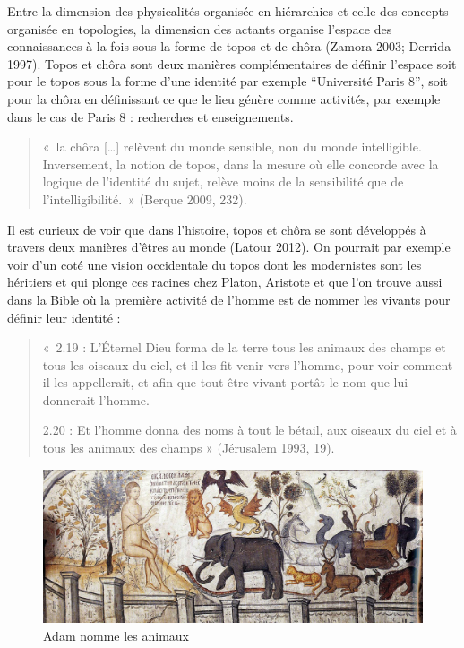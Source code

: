 \documentclass[
  letterpaper,
  DIV=11,
  numbers=noendperiod]{scrreprt}
\begin{document}
Entre la dimension des physicalités organisée en hiérarchies et celle
des concepts organisée en topologies, la dimension des actants organise
l'espace des connaissances à la fois sous la forme de topos et de chôra
(Zamora 2003; Derrida 1997). Topos et chôra sont deux manières
complémentaires de définir l'espace soit pour le topos sous la forme
d'une identité par exemple ``Université Paris 8'', soit pour la chôra en
définissant ce que le lieu génère comme activités, par exemple dans le
cas de Paris 8 : recherches et enseignements.

\begin{quote}
«~la chôra {[}\ldots{]} relèvent du monde sensible, non du monde
intelligible. Inversement, la notion de topos, dans la mesure où elle
concorde avec la logique de l'identité du sujet, relève moins de la
sensibilité que de l'intelligibilité.~» (Berque 2009, 232).
\end{quote}

Il est curieux de voir que dans l'histoire, topos et chôra se sont
développés à travers deux manières d'êtres au monde (Latour 2012). On
pourrait par exemple voir d'un coté une vision occidentale du topos dont
les modernistes sont les héritiers et qui plonge ces racines chez
Platon, Aristote et que l'on trouve aussi dans la Bible où la première
activité de l'homme est de nommer les vivants pour définir leur identité
:

\begin{quote}
«~2.19 : L'Éternel Dieu forma de la terre tous les animaux des champs et
tous les oiseaux du ciel, et il les fit venir vers l'homme, pour voir
comment il les appellerait, et afin que tout être vivant portât le nom
que lui donnerait l'homme.

2.20 : Et l'homme donna des noms à tout le bétail, aux oiseaux du ciel
et à tous les animaux des champs » (Jérusalem 1993, 19).
\end{quote}

\begin{figure}

{\centering \includegraphics{images/Adam_naming_animals_-_Moni_Ayou_Nikolaou_(Meteora).jpg}

}

\caption{\label{fig-adamNomme}Adam nomme les animaux}

\end{figure}
\end{document}
